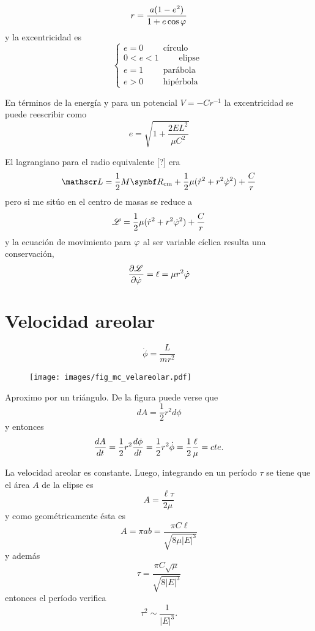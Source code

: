 \documentclass[10pt,oneside]{CBFT_book}
\begin{document}
\[
	r = \frac{a(1-e^2)}{1 + e\cos\varphi}
\]
y la excentricidad es 
\[
	\begin{cases}
	e = 0 \qquad \text{ círculo } \\
	0 < e < 1 \qquad \text{ elipse } \\
	e = 1 \qquad \text{ parábola } \\
	e > 0 \qquad \text{ hipérbola }
	\end{cases}
\]

En términos de la energía y para un potencial $ V = - Cr^{-1}$ la excentricidad se puede reescribir como 
\[
	e = \sqrt{ 1 + \frac{2EL^2}{\mu C^2} }
\]

El lagrangiano para el radio equivalente [?] era
\[
	\Lag = \frac{1}{2} M \vb{R}_{\text{cm}} + \frac{1}{2} \mu (\dot{r}^2 + r^2 \dot{\vp}^2) + \frac{C}{r}
\]
pero si me sitúo en el centro de masas se reduce a 
\[
	\mathscr{L} = \frac{1}{2} \mu (\dot{r}^2 + r^2 \dot{\varphi}^2) + \frac{C}{r}
\]
y la ecuación de movimiento para $ \varphi $ al ser variable cíclica resulta una conservación,
\[
	\frac{\partial^{\hspace{-0.05em}} {\mathscr{L}}}{\partial {\dot{\varphi}}^{\hspace{-0.05em}}} = \ell = \mu r^2 \dot{\varphi}
\]

\section{Velocidad areolar}

\[
	\dot{\phi} = \frac{L}{m r^2}
\]
\begin{figure}[hbt]
	\begin{center}
	\texttt{[image: images/fig\_mc\_velareolar.pdf]}	 
	\end{center}
	\caption{}
\end{figure} 
Aproximo por un triángulo.
De la figura puede verse que 
\[
	dA = \frac{1}{2} r^2 d\phi 
\]
y  entonces
\[
	\frac{d^{\hspace{-0.05em}} {A}}{d {t}^{\hspace{-0.05em}}} = \frac{1}{2} r^2 \frac{d^{\hspace{-0.05em}} {\phi}}{d {t}^{\hspace{-0.05em}}} = \frac{1}{2} r^2 \dot{\phi} = \frac{1}{2}\frac{\ell}{\mu} = cte.
\]

La velocidad areolar es constante. Luego, integrando en un período $\tau$ se tiene que el área $A$ de la elipse es
\[
	A = \frac{\ell \tau}{2\mu}
\]
y como geométricamente ésta es 
\[
	A = \pi a b = \frac{ \pi C \ell }{\sqrt{ 8 \mu |E|^3 }}
\]
y además 
\[
	\tau = \frac{ \pi C \sqrt{\mu } }{ \sqrt{ 8 |E|^3 } }
\]
entonces el período verifica 
\[
	\tau^2 \sim \frac 1 {|E|^{3}}.
\]
\end{document}
